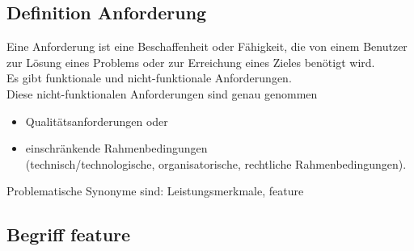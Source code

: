 \subsection{Definition Anforderung}\parskp
Eine Anforderung ist eine Beschaffenheit oder Fähigkeit, die von einem Benutzer zur Lösung eines Problems oder zur Erreichung eines Zieles benötigt wird.\\
Es gibt funktionale und nicht-funktionale Anforderungen.\\
Diese nicht-funktionalen Anforderungen sind genau genommen
\begin{itemize}
\item Qualitätsanforderungen oder
\item einschränkende Rahmenbedingungen\\
(technisch/technologische, organisatorische, rechtliche Rahmenbedingungen).
\end{itemize}
Problematische Synonyme sind: Leistungsmerkmale, feature

\subsection{Begriff feature}

